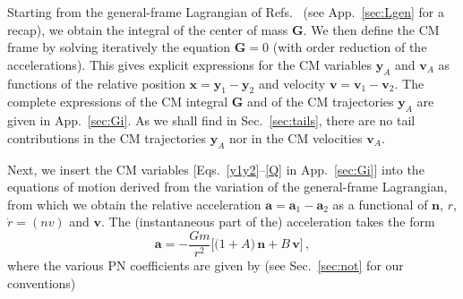 \documentclass[prd,preprint,superscriptaddress,tightenlines,nofootinbib,
  eqsecnum,showpacs]{revtex4}
\begin{document}
Starting from the general-frame Lagrangian of Refs.~\cite{BBBFMa,BBBFMb} (see
App.~\ref{sec:Lgen} for a recap), we obtain the integral of the center of mass
$\bm{G}$. We then define the CM frame by solving iteratively the equation
$\bm{G} = 0$ (with order reduction of the accelerations). This gives explicit
expressions for the CM variables $\bm{y}_A$ and $\bm{v}_A$ as functions of the
relative position $\bm{x}=\bm{y}_1-\bm{y}_2$ and velocity
$\bm{v}=\bm{v}_1-\bm{v}_2$. The complete expressions of the CM integral
$\bm{G}$ and of the CM trajectories $\bm{y}_A$ are given in App.~\ref{sec:Gi}.
As we shall find in Sec.~\ref{sec:tails}, there are no tail contributions in
the CM trajectories $\bm{y}_A$ nor in the CM velocities
$\bm{v}_A$.

Next, we insert the CM variables [Eqs.~\eqref{y1y2}--\eqref{Q} in
App.~\ref{sec:Gi}] into the equations of motion derived from the variation of
the general-frame Lagrangian, from which we obtain the relative
acceleration $\bm{a}= \bm{a}_1-\bm{a}_2$ as a functional
of $\bm{n}$, $r$, $\dot{r}=(nv)$ and $\bm{v}$. The (instantaneous part of the)
acceleration takes the form
%
\begin{equation}\label{dvdt}
\bm{a} = -\frac{G m}{r^2}\Big[\big(1+A\big)\,\bm{n} +
    B\,\bm{v} \Big] \,,
\end{equation}
% 
where the various PN coefficients are given by (see Sec.~\ref{sec:not} for our conventions)
%
\end{document}
